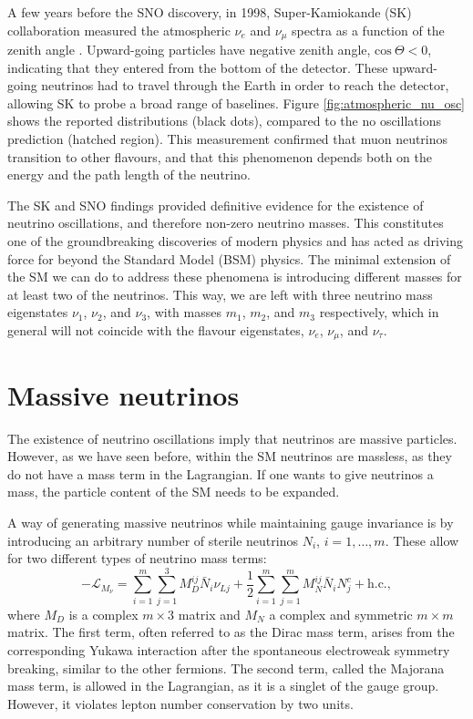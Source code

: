 A few years before the SNO discovery, in 1998, Super-Kamiokande (SK) collaboration measured the atmospheric $\nu_{e}$ and $\nu_{\mu}$ spectra as a function of the zenith angle \cite{SuperKamiokande1998}. Upward-going particles have negative zenith angle, $\mathrm{cos}~\Theta < 0$, indicating that they entered from the bottom of the detector. These upward-going neutrinos had to travel through the Earth in order to reach the detector, allowing SK to probe a broad range of baselines. Figure \ref{fig:atmospheric_nu_osc} shows the reported distributions (black dots), compared to the no oscillations prediction (hatched region). This measurement confirmed that muon neutrinos transition to other flavours, and that this phenomenon depends both on the energy and the path length of the neutrino.

The SK and SNO findings provided definitive evidence for the existence of neutrino oscillations, and therefore non-zero neutrino masses. This constitutes one of the groundbreaking discoveries of modern physics and has acted as driving force for beyond the Standard Model (BSM) physics. The minimal extension of the SM we can do to address these phenomena is introducing different masses for at least two of the neutrinos. This way, we are left with three neutrino mass eigenstates $\nu_{1}$, $\nu_{2}$, and $\nu_{3}$, with masses $m_{1}$, $m_{2}$, and $m_{3}$ respectively, which in general will not coincide with the flavour eigenstates, $\nu_{e}$, $\nu_{\mu}$, and $\nu_{\tau}$.

\section{Massive neutrinos}

The existence of neutrino oscillations imply that neutrinos are massive particles. However, as we have seen before, within the SM neutrinos are massless, as they do not have a mass term in the Lagrangian. If one wants to give neutrinos a mass, the particle content of the SM needs to be expanded.

A way of generating massive neutrinos while maintaining gauge invariance is by introducing an arbitrary number of sterile neutrinos $N_{i}$, $i=1,\dots,m$. These allow for two different types of neutrino mass terms:
\begin{equation}\label{2.10}
	-\mathcal{L}_{M_{\nu}} = \sum_{i=1}^{m} \sum_{j=1}^{3} M^{ij}_{D} \bar{N}_{i} \nu_{Lj} + \frac{1}{2} \sum_{i=1}^{m} \sum_{j=1}^{m} M^{ij}_{N} \bar{N}_{i} N^{c}_{j} + \mathrm{h.c.},
\end{equation}
where $M_{D}$ is a complex $m \times 3$ matrix and $M_{N}$ a complex and symmetric $m \times m$ matrix. The first term, often referred to as the Dirac mass term, arises from the corresponding Yukawa interaction after the spontaneous electroweak symmetry breaking, similar to the other fermions. The second term, called the Majorana mass term, is allowed in the Lagrangian, as it is a singlet of the gauge group. However, it violates lepton number conservation by two units.

